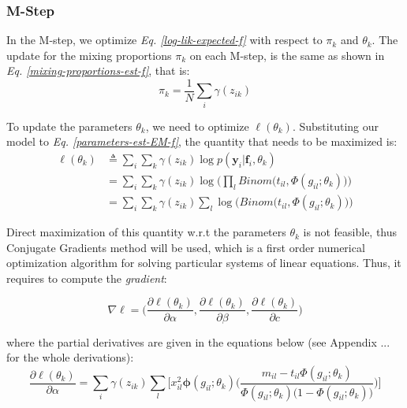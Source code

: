 \subsubsection{M-Step}
In the M-step, we optimize \emph{Eq. \ref{log-lik-expected-f}} with respect to $\pi_{k}$ and $\theta_{k}$. The update for the mixing proportions $\pi_{k}$ on each M-step, is the same as shown in \emph{Eq. \ref{mixing-proportions-est-f}}, that is:
\begin{equation} \label{mixing-proportions-est2-f}
		\pi_{k} = \frac{1}{N} \sum_{i} \gamma(z_{ik})
\end{equation}

To update the parameters $\theta_{k}$, we need to optimize $\ell(\theta_{k})$. Substituting our model to \emph{Eq. \ref{parameters-est-EM-f}}, the quantity that needs to be maximized is:
\begin{equation} \label{parameters-est2-EM-f}
  \begin{split}
	\ell(\theta_{k}) & \triangleq \sum_{i} \sum_{k} \gamma(z_{ik}) \log p(\mathbf{y}_{i}|\mathbf{f}_{i}, \theta_{k}) \\
					 & = \sum_{i} \sum_{k} \gamma(z_{ik}) \log \bigg( \prod_{l} Binom \big(t_{il}, \Phi(g_{il}; \theta_{k})\big) \bigg)\\
					 & = \sum_{i} \sum_{k} \gamma(z_{ik}) \sum_{l} \log \bigg(Binom \big(t_{il}, \Phi(g_{il}; \theta_{k})\big) \bigg)
  \end{split}
\end{equation}

Direct maximization of this quantity w.r.t the parameters $\theta_{k}$ is not feasible, thus Conjugate Gradients method \citep{Hestenes1952} will be used, which is a first order numerical optimization algorithm for solving particular systems of linear equations. Thus, it requires to compute the \emph{gradient}:

\begin{equation} \label{gradient-f}
	\nabla\ell = \bigg( \frac{\partial \ell(\theta_{k})}{\partial \alpha}, \frac{\partial \ell(\theta_{k})}{\partial \beta}, \frac{\partial \ell(\theta_{k})}{\partial c}\bigg) 
\end{equation}

where the partial derivatives are given in the equations below (see Appendix ... for the whole derivations):
\begin{equation} \label{derivative-a-f}
	\frac{\partial \ell(\theta_{k})}{\partial \alpha} =  \sum_{i}  \gamma(z_{ik}) \sum_{l} \bigg[ x_{il}^{2} \mathbf{\phi}(g_{il};\theta_{k})\bigg(\frac{m_{il} - t_{il}\Phi(g_{il};\theta_{k})}{\Phi(g_{il};\theta_{k})\big(1-\Phi(g_{il};\theta_{k})\big)} \bigg) \bigg]
\end{equation}

